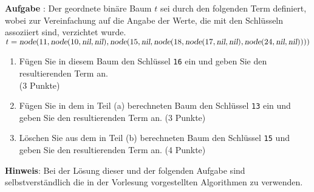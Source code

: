 \documentclass{article}
\newcounter{aufgabe}
\newcommand{\exercise}{\vspace*{0.2cm}
\stepcounter{aufgabe}

\noindent
\textbf{Aufgabe \arabic{aufgabe}}: }
\begin{document}
\exercise
Der geordnete bin\"are Baum $t$ sei durch den folgenden Term definiert,
wobei zur Vereinfachung auf die Angabe der Werte, die mit den Schl\"usseln
assoziiert sind, verzichtet wurde.
\\[0.2cm]
\hspace*{1.3cm}
$t = \textsl{node}(11, \textsl{node}(10, \textsl{nil}, \textsl{nil}), \textsl{node}(15, \textsl{nil}, 
  \textsl{node}(18, \textsl{node}(17, \textsl{nil}, \textsl{nil}), 
  \textsl{node}(24, \textsl{nil}, \textsl{nil}))))
$
\begin{enumerate}
\item F\"ugen Sie in diesem Baum den Schl\"ussel \texttt{16} ein und geben Sie den
      resultierenden Term an.  \\ 
      \hspace*{\fill} (3 Punkte)
\item F\"ugen Sie in dem in Teil (a) berechneten Baum den Schl\"ussel \texttt{13} ein und
      geben Sie den resultierenden Term an.     
      \hspace*{\fill} (3 Punkte)
\item L\"oschen Sie aus dem in Teil (b) berechneten Baum den Schl\"ussel \texttt{15} und
      geben Sie den resultierenden Term an. 
      \hspace*{\fill} (4 Punkte)
\end{enumerate}
\textbf{Hinweis}: Bei der L\"osung dieser und der folgenden Aufgabe sind selbstverst\"andlich
die in der Vorlesung vorgestellten Algorithmen zu verwenden.
\vspace{0.3cm}
\end{document}
